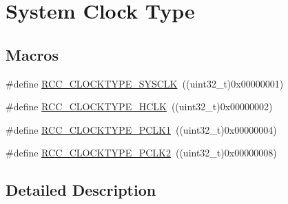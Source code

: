 \hypertarget{group___r_c_c___system___clock___type}{\section{System Clock Type}
\label{group___r_c_c___system___clock___type}
}
\subsection*{Macros}
\begin{DoxyCompactItemize}
\item 
\#define \hyperlink{group___r_c_c___system___clock___type_ga7e721f5bf3fe925f78dae0356165332e}{R\-C\-C\-\_\-\-C\-L\-O\-C\-K\-T\-Y\-P\-E\-\_\-\-S\-Y\-S\-C\-L\-K}~((uint32\-\_\-t)0x00000001)
\item 
\#define \hyperlink{group___r_c_c___system___clock___type_gaa5330efbd790632856a2b15851517ef9}{R\-C\-C\-\_\-\-C\-L\-O\-C\-K\-T\-Y\-P\-E\-\_\-\-H\-C\-L\-K}~((uint32\-\_\-t)0x00000002)
\item 
\#define \hyperlink{group___r_c_c___system___clock___type_gab00c7b70f0770a616be4b5df45a454c4}{R\-C\-C\-\_\-\-C\-L\-O\-C\-K\-T\-Y\-P\-E\-\_\-\-P\-C\-L\-K1}~((uint32\-\_\-t)0x00000004)
\item 
\#define \hyperlink{group___r_c_c___system___clock___type_gaef7e78706e597a6551d71f5f9ad60cc0}{R\-C\-C\-\_\-\-C\-L\-O\-C\-K\-T\-Y\-P\-E\-\_\-\-P\-C\-L\-K2}~((uint32\-\_\-t)0x00000008)
\end{DoxyCompactItemize}


\subsection{Detailed Description}


